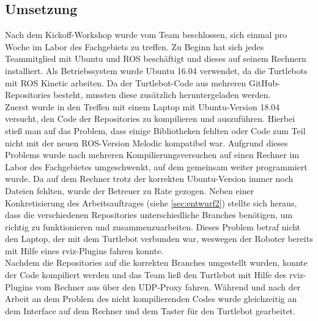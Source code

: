 \documentclass[a4paper,12pt,headsepline]{scrartcl}
\begin{document}
		
	\subsection{Umsetzung}
		Nach dem Kickoff-Workshop wurde vom Team beschlossen, sich einmal pro Woche im Labor des Fachgebiets zu treffen. Zu Beginn hat sich jedes Teammitglied mit Ubuntu und ROS beschäftigt und dieses auf seinem Rechnern installiert. Als Betriebssystem wurde Ubuntu 16.04 verwendet, da die Turtlebots mit ROS Kinetic arbeiten. Da der Turtlebot-Code aus mehreren GitHub-Repositories besteht, mussten diese zusätzlich heruntergeladen werden.\\
		Zuerst wurde in den Treffen mit einem Laptop mit Ubuntu-Version 18.04 versucht, den Code der Repositories zu kompilieren und auszuführen. Hierbei stieß man auf das Problem, dass einige Bibliotheken fehlten oder Code zum Teil nicht mit der neuen ROS-Version Melodic kompatibel war. Aufgrund dieses Problems wurde nach mehreren Kompilierungsversuchen auf einen Rechner im Labor des Fachgebietes umgeschwenkt, auf dem gemeinsam weiter programmiert wurde. Da auf dem Rechner trotz der korrekten Ubuntu-Version immer noch Dateien fehlten, wurde der Betreuer zu Rate gezogen. Neben einer Konkretisierung des Arbeitsauftrages (siehe \cref{sec:entwurf2}) stellte sich heraus, dass die verschiedenen Repositories unterschiedliche Branches benötigen, um richtig zu funktionieren und zusammenzuarbeiten. Dieses Problem betraf nicht den Laptop, der mit dem Turtlebot verbunden war, weswegen der Roboter bereits mit Hilfe eines rviz-Plugins fahren konnte.\\
		Nachdem die Repositories auf die korrekten Branches umgestellt wurden, konnte der Code kompiliert werden und das Team ließ den Turtlebot mit Hilfe des rviz-Plugins vom Rechner aus über den UDP-Proxy fahren. Während und nach der Arbeit an dem Problem des nicht kompilierenden Codes wurde gleichzeitig an dem Interface auf dem Rechner und dem Taster für den Turtlebot gearbeitet.
%
\end{document}
